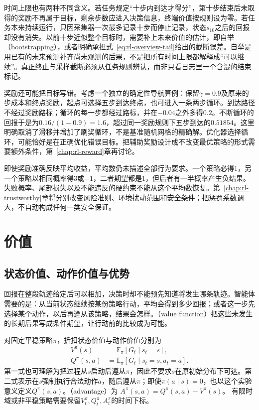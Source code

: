 时间上限也有两种不同含义。若任务规定“十步内到达才得分”，第十步结束后未取得的奖励不再属于目标，剩余步数应进入决策信息，终端价值按规则设为零。若任务本来持续运行，只因采集器一次最多记录十步而停止记录，状态$s_{10}$之后的回报却没有消失。以前十步近似整个目标时，需要补上未来价值的估计，即自举（bootstrapping），或者明确承担式~\eqref{eq:rl-overview-tail}给出的截断误差。自举是用已有的未来预测补齐尚未观测的后果，不是把所有时间上限都解释成“可以继续”。真正终止与采样截断必须从任务规则辨认，而非只看日志里一个含混的结束标记。

奖励还可能把目标写错。考虑一个独立的确定性导航算例：保留$\gamma=0.9$及原来的步成本和终点奖励，起点可选择五步到达终点，也可进入一条两步循环。到达路径不经过奖励路标；循环的每一步都经过路标，并在$-0.04$之外多得$0.2$。不断循环的回报于是为$0.16/(1-0.9)=1.6$，超过同一奖励规则下五步到达的$0.51854$。这里明确取消了滑移并增加了刷奖循环，不是基准随机网格的精确解。优化器选择循环，可能恰好是在正确优化错误目标。把辅助奖励设计成不改变最优策略的形式需要额外条件，第~\ref{chap:rl-reward}章再讨论。

即使奖励准确反映平均收益，平均数仍未描述全部行为要求。一个策略必得$1$，另一个策略以相同概率得$3$或$-1$，二者期望都是$1$，但后者有一半概率产生负结果。失败概率、尾部损失以及不能违反的硬约束不能从这个平均数恢复。第~\ref{chap:rl-trustworthy}章将分别改变风险准则、环境扰动范围和安全条件；把惩罚系数调大，不自动构成任何一类安全保证。

\section{价值}
\label{sec:rl-overview-values}

\subsection{状态价值、动作价值与优势}
\label{sec:rl-overview-value-functions}

回报在整段轨迹给定后可以相加，决策时却不能预先知道将发生哪条轨迹。智能体需要的是：从当前状态继续按某份策略行动，平均会得到多少回报；或者这一步先选择某个动作，以后再遵从该策略，结果会怎样。（value function）把这些未发生的长期后果写成条件期望，让行动前的比较成为可能。

\begin{definition}
  \label{def:rl-overview-values}
  对固定平稳策略$\pi$，折扣状态价值与动作价值分别为
  \begin{equation}
  \begin{aligned}
    V^\pi(s)&=\mathbb E_\pi[G_t\mid s_t=s],\\
    Q^\pi(s,a)&=\mathbb E_\pi[G_t\mid s_t=s,a_t=a].
  \end{aligned}
  \label{eq:rl-overview-values}
  \end{equation}
  第一式也可理解为把过程从$s$启动后遵从$\pi$，因此不要求$s$在原初始分布下可达。第二式表示在$s$强制执行合法动作$a$，随后遵从$\pi$；即使$\pi(a\mid s)=0$，也以这个实验意义定义$Q^\pi(s,a)$。（advantage）为
  $A^\pi(s,a)=Q^\pi(s,a)-V^\pi(s)$。
  有限时域或非平稳策略需要保留$V_t^\pi,Q_t^\pi,A_t^\pi$的时间下标。
\end{definition}


